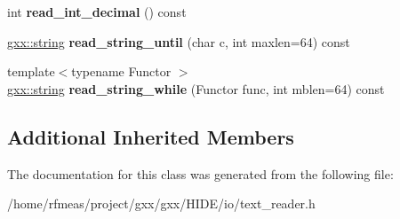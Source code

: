 \begin{DoxyCompactItemize}
\item 
int {\bfseries read\+\_\+int\+\_\+decimal} () const \hypertarget{classgxx_1_1text__reader_ab308dc04d06a1ae476489c304319c6dc}{}\label{classgxx_1_1text__reader_ab308dc04d06a1ae476489c304319c6dc}

\item 
\hyperlink{classgxx_1_1basic__string}{gxx\+::string} {\bfseries read\+\_\+string\+\_\+until} (char c, int maxlen=64) const \hypertarget{classgxx_1_1text__reader_a7d52ff161cc59eff8305cafecb7ab52c}{}\label{classgxx_1_1text__reader_a7d52ff161cc59eff8305cafecb7ab52c}

\item 
{\footnotesize template$<$typename Functor $>$ }\\\hyperlink{classgxx_1_1basic__string}{gxx\+::string} {\bfseries read\+\_\+string\+\_\+while} (Functor func, int mblen=64) const \hypertarget{classgxx_1_1text__reader_a27399fb86ffb36c128a8b99c19e749fe}{}\label{classgxx_1_1text__reader_a27399fb86ffb36c128a8b99c19e749fe}

\end{DoxyCompactItemize}
\subsection*{Additional Inherited Members}


The documentation for this class was generated from the following file\+:\begin{DoxyCompactItemize}
\item 
/home/rfmeas/project/gxx/gxx/\+H\+I\+D\+E/io/text\+\_\+reader.\+h\end{DoxyCompactItemize}
